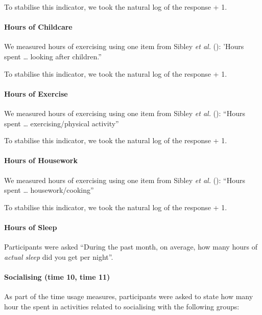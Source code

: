 \documentclass[
  single column]{article}
\let\oldparagraph\paragraph
\renewcommand{\paragraph}[1]{\oldparagraph{#1}\mbox{}}
\begin{document}
To stabilise this indicator, we took the natural log of the response +
1.

\paragraph{Hours of Childcare}\label{hours-of-childcare-1}

We measured hours of exercising using one item from Sibley \emph{et al.}
(): 'Hours spent \ldots{} looking after
children.''

To stabilise this indicator, we took the natural log of the response +
1.

\paragraph{Hours of Exercise}\label{hours-of-exercise-1}

We measured hours of exercising using one item from Sibley \emph{et al.}
(): ``Hours spent \ldots{}
exercising/physical activity''

To stabilise this indicator, we took the natural log of the response +
1.

\paragraph{Hours of Housework}\label{hours-of-housework-1}

We measured hours of exercising using one item from Sibley \emph{et al.}
(): ``Hours spent \ldots{}
housework/cooking''

To stabilise this indicator, we took the natural log of the response +
1.

\paragraph{Hours of Sleep}\label{hours-of-sleep}

Participants were asked ``During the past month, on average, how many
hours of \emph{actual sleep} did you get per night''.

\paragraph{Socialising (time 10, time
11)}\label{socialising-time-10-time-11}

As part of the time usage measures, participants were asked to state how
many hour the spent in activities related to socialising with the
following groups:
\end{document}
